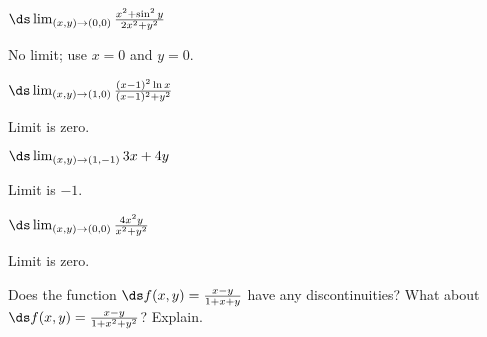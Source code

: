 \begin{enumialphparenastyle}
\begin{ex}
$\ds\lim_{(x,y)\to(0,0)}{x^2 + \sin^2 y\over 2x^2+y^2}$
\begin{sol}
No limit; use $x=0$ and $y=0$.
\end{sol}
\end{ex}

\begin{ex}
$\ds\lim_{(x,y)\to(1,0)}{(x-1)^2\ln x\over(x-1)^2+y^2}$
\begin{sol}
Limit is zero.
\end{sol}
\end{ex}

\begin{ex}
$\ds\lim_{(x,y)\to(1,-1)}{3x+4y}$
\begin{sol}
Limit is $-1$.
\end{sol}
\end{ex}

\begin{ex}
$\ds\lim_{(x,y)\to(0,0)}{4x^2y\over x^2+y^2}$
\begin{sol}
Limit is zero.
\end{sol}
\end{ex}

\begin{ex}
Does the function $\ds f(x,y)={x-y\over 1+x+y}$ 
have any discontinuities?  What about 
$\ds f(x,y)={x-y\over 1+x^2+y^2}$?  Explain.
\end{ex}

\end{enumialphparenastyle}